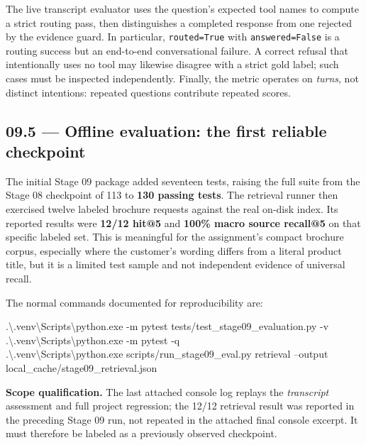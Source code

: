 \documentclass[11pt,a4paper]{article}
\begin{document}
The live transcript evaluator uses the question's expected tool names to compute a strict routing pass, then distinguishes a completed response from one rejected by the evidence guard. In particular, \texttt{routed=True} with \texttt{answered=False} is a routing success but an end-to-end conversational failure. A correct refusal that intentionally uses no tool may likewise disagree with a strict gold label; such cases must be inspected independently. Finally, the metric operates on \emph{turns}, not distinct intentions: repeated questions contribute repeated scores.

\subsection{09.5 --- Offline evaluation: the first reliable checkpoint}
The initial Stage 09 package added seventeen tests, raising the full suite from the Stage 08 checkpoint of 113 to \textbf{130 passing tests}. The retrieval runner then exercised twelve labeled brochure requests against the real on-disk index. Its reported results were \textbf{12/12 hit@5} and \textbf{100\% macro source recall@5} on that specific labeled set. This is meaningful for the assignment's compact brochure corpus, especially where the customer's wording differs from a literal product title, but it is a limited test sample and not independent evidence of universal recall.

The normal commands documented for reproducibility are:
\begin{examplebox}
\footnotesize\ttfamily
.\textbackslash.venv\textbackslash Scripts\textbackslash python.exe -m pytest\newline
\hspace*{1.6em}tests/test\_stage09\_evaluation.py -v\\[2pt]
.\textbackslash.venv\textbackslash Scripts\textbackslash python.exe -m pytest -q\\[2pt]
.\textbackslash.venv\textbackslash Scripts\textbackslash python.exe\newline
\hspace*{1.6em}scripts/run\_stage09\_eval.py retrieval --output\newline
\hspace*{1.6em}local\_cache/stage09\_retrieval.json
\end{examplebox}
\textbf{Scope qualification.} The last attached console log replays the \emph{transcript} assessment and full project regression; the 12/12 retrieval result was reported in the preceding Stage 09 run, not repeated in the attached final console excerpt. It must therefore be labeled as a previously observed checkpoint.
\end{document}
